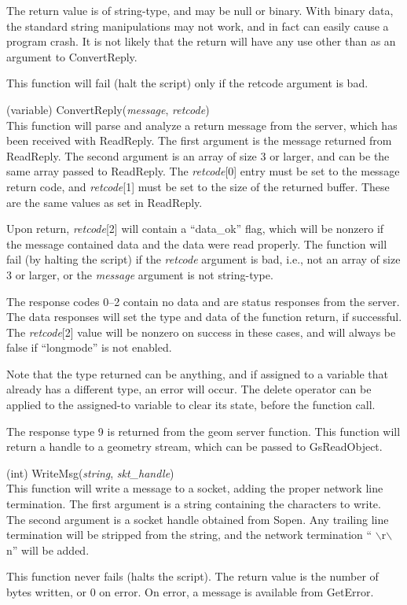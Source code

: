 \begin{description}
The return value is of string-type, and may be null or binary.  With
binary data, the standard string manipulations may not work, and in
fact can easily cause a program crash.  It is not likely that the
return will have any use other than as an argument to {\vt
ConvertReply}.

This function will fail (halt the script) only if the retcode argument
is bad.

\item{(variable) \vt ConvertReply({\it message\/}, {\it retcode\/})}\\
This function will parse and analyze a return message from the {\Xic}
server, which has been received with {\vt ReadReply}.  The first
argument is the message returned from {\vt ReadReply}.  The second
argument is an array of size 3 or larger, and can be the same array
passed to {\vt ReadReply}.  The {\it retcode\/}[0] entry must be set
to the message return code, and {\it retcode\/}[1] must be set to the
size of the returned buffer.  These are the same values as set in {\vt
ReadReply}.

Upon return, {\it retcode\/}[2] will contain a ``data\_ok'' flag,
which will be nonzero if the message contained data and the data were
read properly.  The function will fail (by halting the script) if the
{\it retcode} argument is bad, i.e., not an array of size 3 or larger,
or the {\it message} argument is not string-type.

The response codes 0--2 contain no data and are status responses
from the server.  The data responses will set the type and data of
the function return, if successful.  The {\it retcode\/}[2] value
will be nonzero on success in these cases, and will always be
false if ``{\vt longmode}'' is not enabled.

Note that the type returned can be anything, and if assigned to a
variable that already has a different type, an error will occur.  The
{\vt delete} operator can be applied to the assigned-to variable to
clear its state, before the function call.

The response type 9 is returned from the {\vt geom} server function. 
This function will return a handle to a geometry stream, which can be
passed to {\vt GsReadObject}.

\item{(int) \vt WriteMsg({\it string\/}, {\it skt\_handle\/})}\\
This function will write a message to a socket, adding the proper
network line termination.  The first argument is a string containing
the characters to write.  The second argument is a socket handle
obtained from {\vt Sopen}.  Any trailing line termination will be
stripped from the string, and the network termination ``{\vt
$\backslash$r$\backslash$n}'' will be added.

This function never fails (halts the script).  The return value is the
number of bytes written, or 0 on error.  On error, a message is
available from {\vt GetError}.

\end{description}



